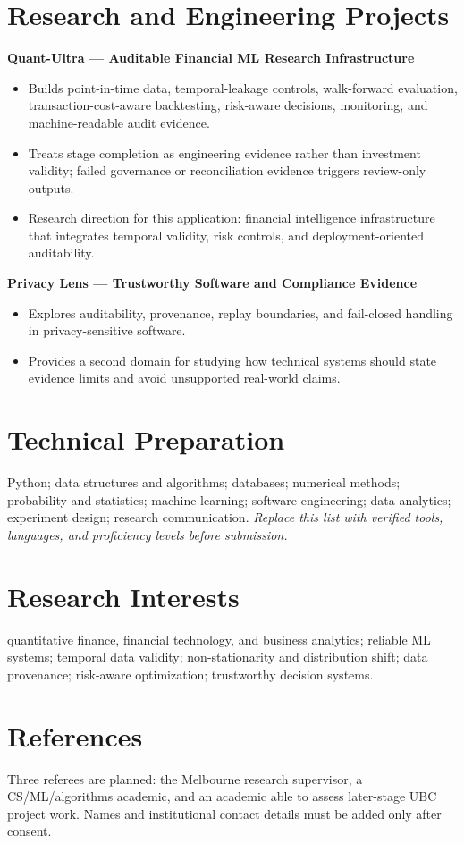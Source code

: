 \documentclass[11pt]{article}
\begin{document}
\section*{Research and Engineering Projects}
\textbf{Quant-Ultra --- Auditable Financial ML Research Infrastructure}
\begin{itemize}
\item Builds point-in-time data, temporal-leakage controls, walk-forward evaluation, transaction-cost-aware backtesting, risk-aware decisions, monitoring, and machine-readable audit evidence.
\item Treats stage completion as engineering evidence rather than investment validity; failed governance or reconciliation evidence triggers review-only outputs.
\item Research direction for this application: financial intelligence infrastructure that integrates temporal validity, risk controls, and deployment-oriented auditability.
\end{itemize}

\begin{samepage}
\textbf{Privacy Lens --- Trustworthy Software and Compliance Evidence}
\begin{itemize}
\item Explores auditability, provenance, replay boundaries, and fail-closed handling in privacy-sensitive software.
\item Provides a second domain for studying how technical systems should state evidence limits and avoid unsupported real-world claims.
\end{itemize}
\end{samepage}

\section*{Technical Preparation}
Python; data structures and algorithms; databases; numerical methods; probability and statistics; machine learning; software engineering; data analytics; experiment design; research communication. \textit{Replace this list with verified tools, languages, and proficiency levels before submission.}

\section*{Research Interests}
quantitative finance, financial technology, and business analytics; reliable ML systems; temporal data validity; non-stationarity and distribution shift; data provenance; risk-aware optimization; trustworthy decision systems.

\section*{References}
Three referees are planned: the Melbourne research supervisor, a CS/ML/algorithms academic, and an academic able to assess later-stage UBC project work. Names and institutional contact details must be added only after consent.
\end{document}
